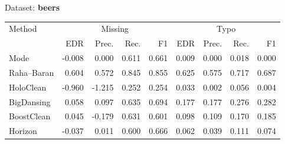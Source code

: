 \begin{subtable}[t]{0.492\linewidth}
\caption{Dataset: \textbf{beers}}
\label{tab:q1-acc-beers}
\centering
\begin{tabular}{lrrrrrrrr}
\toprule
\multirow{2}{*}{Method} &\multicolumn{4}{c}{Missing} &\multicolumn{4}{c}{Typo}\\
\cmidrule(lr){2-5}\cmidrule(l){6-9}
 & EDR & Prec. & Rec. & F1 & EDR & Prec. & Rec. & F1\\
\midrule
\midrule
Mode & -0.008 & 0.000 & 0.611 & 0.661 & 0.009 & 0.000 & 0.018 & 0.000 \\
Raha–Baran & 0.604 & 0.572 & 0.845 & 0.855 & 0.625 & 0.575 & 0.717 & 0.687 \\
HoloClean & -0.960 & -1.215 & 0.252 & 0.254 & 0.033 & 0.002 & 0.056 & 0.004 \\
BigDansing & 0.058 & 0.097 & 0.635 & 0.694 & 0.177 & 0.177 & 0.276 & 0.282 \\
BoostClean & 0.045 & -0.179 & 0.631 & 0.601 & 0.098 & 0.109 & 0.170 & 0.185 \\
Horizon & -0.037 & 0.011 & 0.600 & 0.666 & 0.062 & 0.039 & 0.111 & 0.074 \\
\bottomrule
\bottomrule
\end{tabular}
\end{subtable}